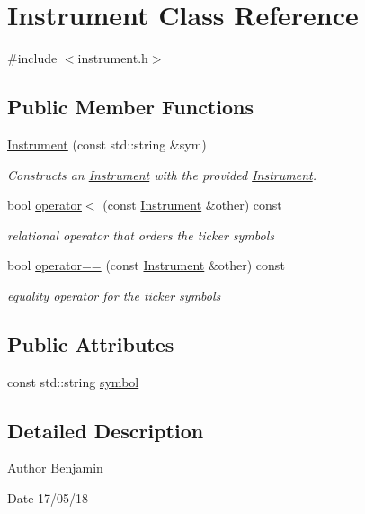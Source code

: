 \hypertarget{classInstrument}{}\section{Instrument Class Reference}
\label{classInstrument}


{\ttfamily \#include $<$instrument.\+h$>$}

\subsection*{Public Member Functions}
\begin{DoxyCompactItemize}
\item 
\hyperlink{classInstrument_af6112f02c5739bd166b78a1734e79b2c}{Instrument} (const std\+::string \&sym)
\begin{DoxyCompactList}\small\item\em Constructs an \hyperlink{classInstrument}{Instrument} with the provided \hyperlink{classInstrument}{Instrument}. \end{DoxyCompactList}\item 
bool \hyperlink{classInstrument_a8ffc6368e7b12588e422145f2b659f9e}{operator$<$} (const \hyperlink{classInstrument}{Instrument} \&other) const
\begin{DoxyCompactList}\small\item\em relational operator that orders the ticker symbols \end{DoxyCompactList}\item 
bool \hyperlink{classInstrument_a5fff991d72c20b0def886d743b6ae0b3}{operator==} (const \hyperlink{classInstrument}{Instrument} \&other) const
\begin{DoxyCompactList}\small\item\em equality operator for the ticker symbols \end{DoxyCompactList}\end{DoxyCompactItemize}
\subsection*{Public Attributes}
\begin{DoxyCompactItemize}
\item 
const std\+::string \hyperlink{classInstrument_a4c469c7cf9512a7b23eb1c26d94a0861}{symbol}
\end{DoxyCompactItemize}


\subsection{Detailed Description}
\begin{DoxyAuthor}{Author}
Benjamin 
\end{DoxyAuthor}
\begin{DoxyDate}{Date}
17/05/18 
\end{DoxyDate}


